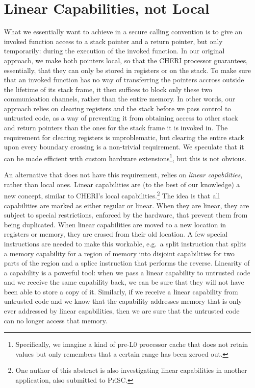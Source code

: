 \documentclass[sigplan, review]{acmart}
\begin{document}
\section{Linear Capabilities, not Local}
What we essentially want to achieve in a secure calling convention is to give an invoked function access to a stack pointer and a return pointer, but only temporarily: during the execution of the invoked function. 
In our original approach, we make both pointers local, so that the CHERI processor guarantees, essentially, that they can only be stored in registers or on the stack.
To make sure that an invoked function has no way of transferring the pointers accross outside the lifetime of its stack frame, it then suffices to block only these two communication channels, rather than the entire memory.
In other words, our approach relies on clearing registers and the stack before we pass control to untrusted code, as a way of preventing it from obtaining access to other stack and return pointers than the ones for the stack frame it is invoked in.
The requirement for clearing registers is unproblematic, but clearing the entire stack upon every boundary crossing is a non-trivial requirement.
We speculate that it can be made efficient with custom hardware extensions\footnote{Specifically, we imagine a kind of pre-L0 processor cache that does not retain values but only remembers that a certain range has been zeroed out.}, but this is not obvious.

An alternative that does not have this requirement, relies on \emph{linear capabilities}, rather than local ones.
Linear capabilities are (to the best of our knowledge) a new concept, similar to CHERI's local capabilities.\footnote{One author of this abstract is also investigating linear capabilities in another application, also submitted to PriSC.}
The idea is that all capabilities are marked as either regular or linear.
When they are linear, they are subject to special restrictions, enforced by the hardware, that prevent them from being duplicated.
When linear capabilities are moved to a new location in registers or memory, they are erased from their old location.
A few special instructions are needed to make this workable, e.g.\ a split instruction that splits a memory capability for a region of memory into disjoint capabilities for two parts of the region and a splice instruction that performs the reverse.
Linearity of a capability is a powerful tool: when we pass a linear capability to untrusted code and we receive the same capability back, we can be sure that they will not have been able to store a copy of it.
Similarly, if we receive a linear capability from untrusted code and we know that the capability addresses memory that is only ever addressed by linear capabilities, then we are sure that the untrusted code can no longer access that memory.
\end{document}

